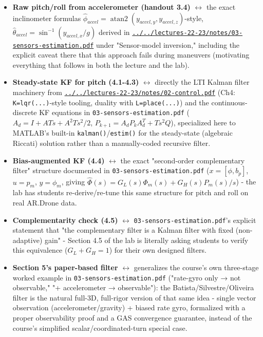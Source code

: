\documentclass[11pt]{article}
\begin{document}
\begin{itemize}
\item \textbf{Raw pitch/roll from accelerometer (handout 3.4)} $\leftrightarrow$ the exact inclinometer formulas $\hat\phi_{accel} = \operatorname{atan2}(y_{accel,y}, y_{accel,z})$-style, $\hat\theta_{accel} = \sin^{-1}(y_{accel,x}/g)$ derived in \href{../../lectures-22-23/notes/03-sensors-estimation.pdf}{\texttt{../../lectures-22-23/notes/03-\allowbreak{}sensors-\allowbreak{}estimation.pdf}} under "Sensor-model inversion," including the explicit caveat there that this approach fails during maneuvers (motivating everything that follows in both the lecture and the lab).
\item \textbf{Steady-state KF for pitch (4.1-4.3)} $\leftrightarrow$ directly the LTI Kalman filter machinery from \href{../../lectures-22-23/notes/02-control.pdf}{\texttt{../../lectures-22-23/notes/02-\allowbreak{}control.pdf}} (Ch4: \texttt{K=lqr(...)}-style tooling, duality with \texttt{L=place(...)}) and the continuous-discrete KF equations in \texttt{03-\allowbreak{}sensors-\allowbreak{}estimation.pdf} ($A_d=I+ATs+A^2Ts^2/2$, $P_{k+1}=A_dP_kA_d^T+Ts^2Q$), specialized here to MATLAB's built-in \texttt{kalman()}/\texttt{estim()} for the steady-state (algebraic Riccati) solution rather than a manually-coded recursive filter.
\item \textbf{Bias-augmented KF (4.4)} $\leftrightarrow$ the exact "second-order complementary filter" structure documented in \texttt{03-\allowbreak{}sensors-\allowbreak{}estimation.pdf} ($x=[\phi,b_p]$, $u=p_m$, $y=\phi_m$, giving $\hat\Phi(s)=G_L(s)\Phi_m(s)+G_H(s)P_m(s)/s$) - the lab has students re-derive/re-tune this same structure for pitch and roll on real AR.Drone data.
\item \textbf{Complementarity check (4.5)} $\leftrightarrow$ \texttt{03-\allowbreak{}sensors-\allowbreak{}estimation.pdf}'s explicit statement that "the complementary filter is a Kalman filter with fixed (non-adaptive) gain" - Section 4.5 of the lab is literally asking students to verify this equivalence ($G_L+G_H=1$) for their own designed filters.
\item \textbf{Section 5's paper-based filter} $\leftrightarrow$ generalizes the course's own three-stage worked example in \texttt{03-\allowbreak{}sensors-\allowbreak{}estimation.pdf} ("rate-gyro only → not observable," "+ accelerometer → observable"): the Batista/Silvestre/Oliveira filter is the natural full-3D, full-rigor version of that same idea - single vector observation (accelerometer/gravity) + biased rate gyro, formalized with a proper observability proof and a GAS convergence guarantee, instead of the course's simplified scalar/coordinated-turn special case.

\end{itemize}
\end{document}
